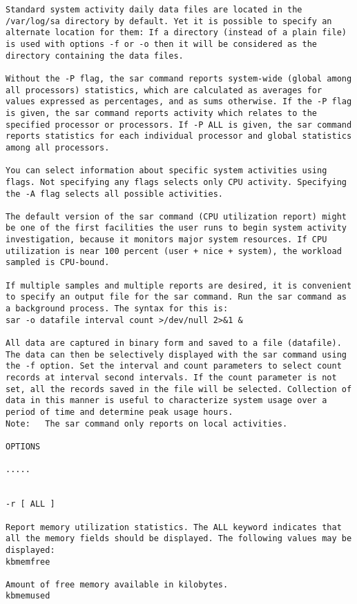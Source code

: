 \begin{verbatim}
Standard system activity daily data files are located in the /var/log/sa directory by default. Yet it is possible to specify an alternate location for them: If a directory (instead of a plain file) is used with options -f or -o then it will be considered as the directory containing the data files.

Without the -P flag, the sar command reports system-wide (global among all processors) statistics, which are calculated as averages for values expressed as percentages, and as sums otherwise. If the -P flag is given, the sar command reports activity which relates to the specified processor or processors. If -P ALL is given, the sar command reports statistics for each individual processor and global statistics among all processors.

You can select information about specific system activities using flags. Not specifying any flags selects only CPU activity. Specifying the -A flag selects all possible activities.

The default version of the sar command (CPU utilization report) might be one of the first facilities the user runs to begin system activity investigation, because it monitors major system resources. If CPU utilization is near 100 percent (user + nice + system), the workload sampled is CPU-bound.  

If multiple samples and multiple reports are desired, it is convenient to specify an output file for the sar command. Run the sar command as a background process. The syntax for this is:  
sar -o datafile interval count >/dev/null 2>&1 &

All data are captured in binary form and saved to a file (datafile). The data can then be selectively displayed with the sar command using the -f option. Set the interval and count parameters to select count records at interval second intervals. If the count parameter is not set, all the records saved in the file will be selected. Collection of data in this manner is useful to characterize system usage over a period of time and determine peak usage hours.
Note:   The sar command only reports on local activities.

OPTIONS

.....


-r [ ALL ]

Report memory utilization statistics. The ALL keyword indicates that all the memory fields should be displayed. The following values may be displayed:
kbmemfree 

Amount of free memory available in kilobytes.
kbmemused 


\end{verbatim}
